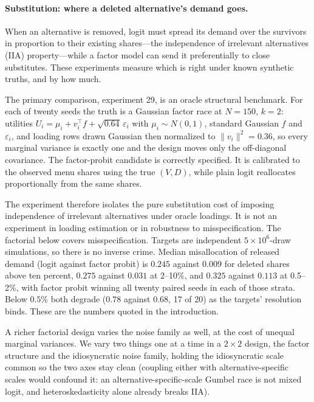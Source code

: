 \documentclass[12pt]{article}
\theoremstyle{remark}
\begin{document}
\paragraph{Substitution: where a deleted alternative's demand goes.}
When an alternative is removed, logit must spread its demand over the
survivors in proportion to their existing shares---the independence of
irrelevant alternatives (IIA) property---while
a factor model can send it preferentially to close substitutes. These
experiments measure which is right under known synthetic truths, and by
how much.

The primary comparison, experiment 29, is an oracle structural
benchmark. For each of twenty seeds the truth is a Gaussian factor race
at $N = 150$, $k = 2$: utilities $U_i = \mu_i + v_i^\top f +
\sqrt{0.64}\,\varepsilon_i$ with $\mu_i \sim N(0,1)$, standard
Gaussian $f$ and $\varepsilon_i$, and loading rows drawn Gaussian then
normalized to $\|v_i\|^2 = 0.36$, so every marginal variance is
exactly one and the design moves only the off-diagonal covariance. The
factor-probit candidate is correctly specified. It is calibrated to the
observed menu shares using the true $(V, D)$, while plain logit
reallocates proportionally from the same shares.

The experiment
therefore isolates the pure substitution cost of imposing independence
of irrelevant alternatives under oracle loadings. It is not an
experiment in loading estimation or in robustness to misspecification.
The factorial below covers misspecification. Targets are independent
$5\times10^6$-draw simulations, so there is no inverse crime. Median misallocation of
released demand (logit against factor probit) is $0.245$ against
$0.009$ for deleted shares above ten percent, $0.275$ against $0.031$
at 2--10\%, and $0.325$ against $0.113$ at 0.5--2\%, with factor
probit winning all twenty paired seeds in each of those strata. Below
$0.5\%$ both degrade ($0.78$ against $0.68$, 17 of 20) as the targets'
resolution binds. These are the numbers quoted in the introduction.

A richer factorial design varies the noise family as well, at the cost
of unequal marginal variances. We vary two things one at a time in a
$2\times2$ design, the factor structure and the idiosyncratic noise
family, holding the idiosyncratic scale common so the two axes stay
clean (coupling either with alternative-specific scales would confound
it: an alternative-specific-scale Gumbel race is not mixed logit, and
heteroskedasticity alone already breaks IIA).
\end{document}
